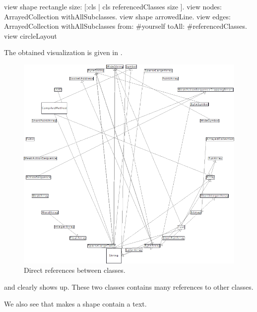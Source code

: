 \documentclass[a4paper,10pt,twoside]{book}
\begin{document}
\begin{code}{}
view shape rectangle size: [:cls | cls referencedClasses size ].
view nodes: ArrayedCollection withAllSubclasses.
view shape arrowedLine.
view 
	edges: ArrayedCollection withAllSubclasses from: #yourself toAll: #referencedClasses.
view circleLayout
\end{code}

The obtained visualization is given in .

\begin{figure}[htbp]
\centerline{\includegraphics[width=\linewidth]{classDependencies}}
\caption{Direct references between classes.}
\label{fig:classDependencies}
\end{figure}

 and  clearly shows up. These two classes contains many references to other classes.

We also see that  makes a shape contain a text.


%
\end{document}
